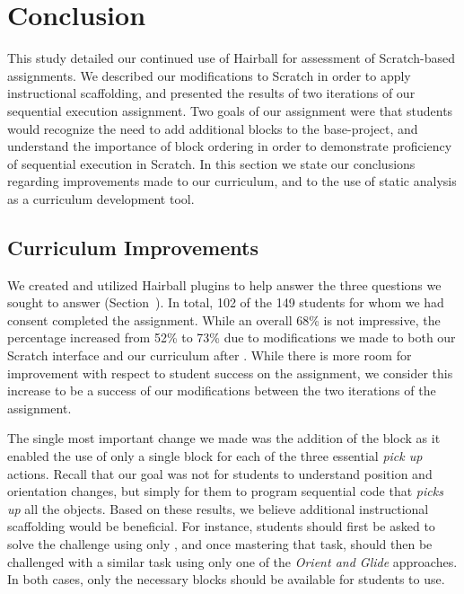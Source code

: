 \section{Conclusion} 
This study detailed our continued use of Hairball for assessment of
Scratch-based assignments. We described our modifications to Scratch in order
to apply instructional scaffolding, and presented the results of two iterations
of our sequential execution assignment. Two goals of our assignment were that
students would recognize the need to add additional blocks to the base-project,
and understand the importance of block ordering in order to demonstrate
proficiency of sequential execution in Scratch. In this section we state our
conclusions regarding improvements made to our curriculum, and to the use of
static analysis as a curriculum development tool.

\subsection{Curriculum Improvements}
We created and utilized Hairball plugins to help answer the three questions we
sought to answer (Section~). In total, 102 of the 149
students for whom we had consent completed the assignment. While an overall
68\% is not impressive, the percentage increased from 52\% to 73\% due to
modifications we made to both our Scratch interface and our curriculum after
\sone{}. While there is more room for improvement with respect to student
success on the assignment, we consider this increase to be a success of our
modifications between the two iterations of the assignment.

The single most important change we made was the addition of the \glideto{}
block as it enabled the use of only a single block for each of the three
essential \emph{pick up} actions. Recall that our goal was not for students to
understand position and orientation changes, but simply for them to program
sequential code that \emph{picks up} all the objects. Based on these results,
we believe additional instructional scaffolding would be beneficial. For
instance, students should first be asked to solve the challenge using only
\glideto{}, and once mastering that task, should then be challenged with a
similar task using only one of the \emph{Orient and Glide} approaches. In both
cases, only the necessary blocks should be available for students to use.

